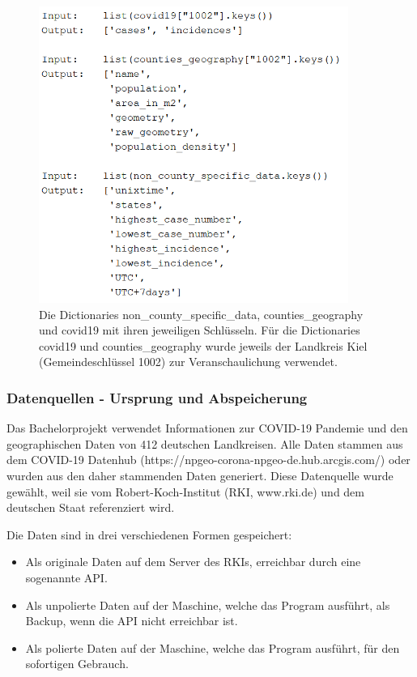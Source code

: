 \begin{figure}
    \centering
    \includegraphics[width=0.9\textwidth]{figures/Dictionarys Bachelorprojekt.png}
    \caption{
    Die Dictionaries non\_county\_specific\_data, counties\_geography und covid19 mit ihren jeweiligen Schlüsseln.
    Für die Dictionaries covid19 und counties\_geography wurde jeweils der Landkreis Kiel (Gemeindeschlüssel 1002) zur Veranschaulichung verwendet.}
    \label{fig:my_label}
\end{figure}

\subsubsection{Datenquellen - Ursprung und Abspeicherung}
Das Bachelorprojekt verwendet Informationen zur COVID-19 Pandemie und den geographischen Daten von 412 deutschen Landkreisen. Alle Daten stammen aus dem \glqq{}COVID-19 Datenhub\grqq{} (https://npgeo-corona-npgeo-de.hub.arcgis.com/) oder wurden aus den daher stammenden Daten generiert. Diese Datenquelle wurde gewählt, weil sie vom Robert-Koch-Institut (RKI, www.rki.de) und dem deutschen Staat referenziert wird.

Die Daten sind in drei verschiedenen Formen gespeichert:
\begin{itemize}
    \item Als originale Daten auf dem Server des RKIs, erreichbar durch eine sogenannte API.
    \item Als unpolierte Daten auf der Maschine, welche das Program ausführt, als Backup, wenn die API nicht erreichbar ist.
    \item Als polierte Daten auf der Maschine, welche das Program ausführt, für den sofortigen Gebrauch.
\end{itemize}
